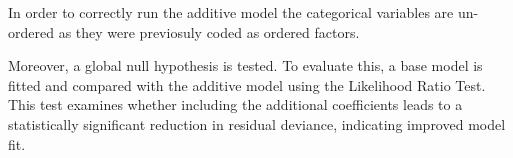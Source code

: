 \documentclass[12pt,letterpaper]{article}
\begin{document}
\noindent In order to correctly run the additive model the categorical variables are un-ordered as they were previosuly coded as ordered factors. 

\vspace{0.5cm}


\vspace{0.5cm}

\noindent Moreover, a global null hypothesis is tested. To evaluate this, a base model is fitted and compared with the additive model using the Likelihood Ratio Test. This test examines whether including the additional coefficients leads to a statistically significant reduction in residual deviance, indicating improved model fit.


\vspace{0.5cm}


\vspace{0.5cm}
\end{document}
